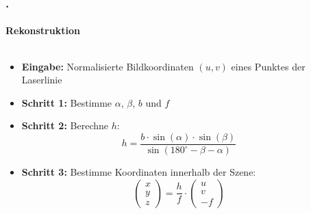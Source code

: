\documentclass[xcolor=dvipsnames]{beamer}
\def\frametitlesec{\frametitle{\arabic{section}.\hspace{0.5ex}\insertsection}}
\def\framesubtitles#1{\framesubtitle{\hspace{3.5ex}#1}}
\begin{document}
\begin{frame}
	\frametitlesec
	\framesubtitles{Rekonstruktion}

	\begin{columns}
		\small
		\begin{column}{.61\linewidth}
			\begin{itemize}
				\item \textbf{Eingabe:} Normalisierte Bildkoordinaten $(u,v)$ eines Punktes der Laserlinie
				\item \textbf{Schritt 1:} Bestimme $\alpha$, $\beta$, $b$ und $f$
				\item \textbf{Schritt 2:} Berechne $h$:
				\[h = \frac{b \cdot \sin(\alpha) \cdot \sin(\beta)}{\sin(180^\circ - \beta - \alpha)}\]
				\item \textbf{Schritt 3:} Bestimme Koordinaten innerhalb der Szene:
				\[\begin{pmatrix}x\\y\\z\end{pmatrix} = \frac{h}{f} \cdot
				\begin{pmatrix}u\\v\\-f\end{pmatrix}\]
			\end{itemize}
		\end{column}
		\begin{column}{.39\linewidth}
			\hfill{}

\end{column}
\end{columns}
\end{frame}
\end{document}

